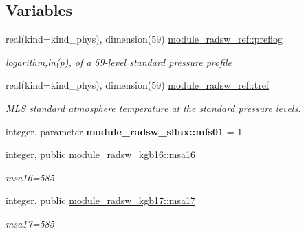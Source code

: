 \subsection*{Variables}
\begin{DoxyCompactItemize}
\item 
\mbox{\label{namespacemodule__radsw__ref_afb71559d084ca709bd134e6c489035e2}} 
real(kind=kind\+\_\+phys), dimension(59) \hyperlink{namespacemodule__radsw__ref_afb71559d084ca709bd134e6c489035e2}{module\+\_\+radsw\+\_\+ref\+::preflog}
\begin{DoxyCompactList}\small\item\em logarithm,ln(p), of a 59-\/level standard pressure profile \end{DoxyCompactList}\item 
\mbox{\label{namespacemodule__radsw__ref_a449fffa7047caa0fba6c166c26f7dbbd}} 
real(kind=kind\+\_\+phys), dimension(59) \hyperlink{namespacemodule__radsw__ref_a449fffa7047caa0fba6c166c26f7dbbd}{module\+\_\+radsw\+\_\+ref\+::tref}
\begin{DoxyCompactList}\small\item\em M\+LS standard atmosphere temperature at the standard pressure levels. \end{DoxyCompactList}\item 
\mbox{\label{namespacemodule__radsw__sflux_aba08e6f9d4dccd130e87300e6fd0ed58}} 
integer, parameter {\bfseries module\+\_\+radsw\+\_\+sflux\+::mfs01} = 1
\item 
\mbox{\label{namespacemodule__radsw__kgb16_ad76a9d79e77228ac93ec3db96eed2b29}} 
integer, public \hyperlink{namespacemodule__radsw__kgb16_ad76a9d79e77228ac93ec3db96eed2b29}{module\+\_\+radsw\+\_\+kgb16\+::msa16}
\begin{DoxyCompactList}\small\item\em msa16=585 \end{DoxyCompactList}\item 
\mbox{\label{namespacemodule__radsw__kgb17_ac139ff93555c22e658cb767fa7142e08}} 
integer, public \hyperlink{namespacemodule__radsw__kgb17_ac139ff93555c22e658cb767fa7142e08}{module\+\_\+radsw\+\_\+kgb17\+::msa17}
\begin{DoxyCompactList}\small\item\em msa17=585 \end{DoxyCompactList}\item 

\end{DoxyCompactItemize}
